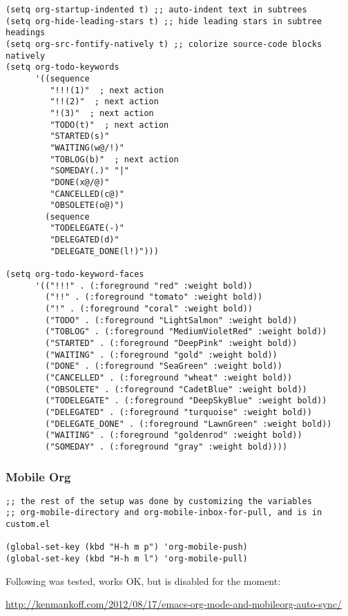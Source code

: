 \documentclass[nofonts]{tufte-handout}
\begin{document}
\begin{verbatim}
(setq org-startup-indented t) ;; auto-indent text in subtrees
(setq org-hide-leading-stars t) ;; hide leading stars in subtree headings
(setq org-src-fontify-natively t) ;; colorize source-code blocks natively
(setq org-todo-keywords
      '((sequence
         "!!!(1)"  ; next action
         "!!(2)"  ; next action
         "!(3)"  ; next action
         "TODO(t)"  ; next action
         "STARTED(s)"
         "WAITING(w@/!)"
         "TOBLOG(b)"  ; next action
         "SOMEDAY(.)" "|"
         "DONE(x@/@)"
         "CANCELLED(c@)"
         "OBSOLETE(o@)")
        (sequence
         "TODELEGATE(-)"
         "DELEGATED(d)"
         "DELEGATE_DONE(l!)")))

(setq org-todo-keyword-faces
      '(("!!!" . (:foreground "red" :weight bold))
        ("!!" . (:foreground "tomato" :weight bold))
        ("!" . (:foreground "coral" :weight bold))
        ("TODO" . (:foreground "LightSalmon" :weight bold))
        ("TOBLOG" . (:foreground "MediumVioletRed" :weight bold))
        ("STARTED" . (:foreground "DeepPink" :weight bold))
        ("WAITING" . (:foreground "gold" :weight bold))
        ("DONE" . (:foreground "SeaGreen" :weight bold))
        ("CANCELLED" . (:foreground "wheat" :weight bold))
        ("OBSOLETE" . (:foreground "CadetBlue" :weight bold))
        ("TODELEGATE" . (:foreground "DeepSkyBlue" :weight bold))
        ("DELEGATED" . (:foreground "turquoise" :weight bold))
        ("DELEGATE_DONE" . (:foreground "LawnGreen" :weight bold))
        ("WAITING" . (:foreground "goldenrod" :weight bold))
        ("SOMEDAY" . (:foreground "gray" :weight bold))))
\end{verbatim}

\subsubsection{Mobile Org}
\label{sec-2-5-6}

\begin{verbatim}
;; the rest of the setup was done by customizing the variables
;; org-mobile-directory and org-mobile-inbox-for-pull, and is in custom.el

(global-set-key (kbd "H-h m p") 'org-mobile-push)
(global-set-key (kbd "H-h m l") 'org-mobile-pull)
\end{verbatim}

Following was tested, works OK, but is disabled for the moment:

\url{http://kenmankoff.com/2012/08/17/emacs-org-mode-and-mobileorg-auto-sync/}
\end{document}
